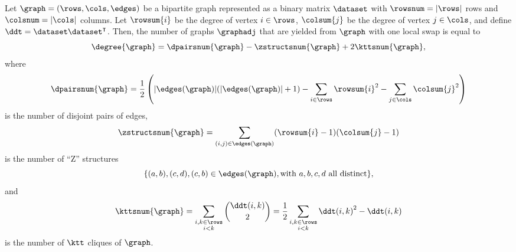 \begin{theorem}\label{thm:degree}
	Let $\graph = (\rows, \cols, \edges)$ be a bipartite graph represented as a
	binary matrix $\dataset$ with $\rowsnum = |\rows|$ rows and $\colsnum =
	|\cols|$ columns. Let $\rowsum{i}$ be the degree of vertex $i \in \rows$,
	$\colsum{j}$ be the degree of vertex $j \in \cols$, and define $\ddt =
	\dataset \dataset^\intercal$. Then, the number of graphs $\graphadj$ that are
	yielded from $\graph$ with one local swap is equal to
	\begin{equation}\label{eq:graphdeg}
		\degree{\graph} = \dpairsnum{\graph} - \zstructsnum{\graph} + 2
		\kttsnum{\graph},
	\end{equation}
	where
	\begin{equation}\label{eq:dpairnum}
		\dpairsnum{\graph} = \frac{1}{2} \left(|\edges(\graph)| (|\edges(\graph)| +
		1) - \sum_{i \in \rows} \rowsum{i}^2 - \sum_{j \in \cols}
		\colsum{j}^2\right)
	\end{equation}
	is the number of disjoint pairs of edges,
	\begin{equation}\label{eq:zstructnum}
		\zstructsnum{\graph} = \sum_{(i, j) \in \edges(\graph)} (\rowsum{i} - 1)
		(\colsum{j} - 1)
	\end{equation}
	is the number of ``Z'' structures
	\[
		\{(a, b), (c, d), (c, b) \in \edges(\graph), \text{with $a, b, c, d$ all
		distinct}\},
	\]
	and
	\begin{equation}\label{eq:kttnum}
		\kttsnum{\graph} = \sum_{\substack{i, k \in \rows \\ i < k}}
		\binom{\ddt(i, k)}{2} = \frac{1}{2} \sum_{\substack{i, k \in \rows \\i <
		k}} {\ddt(i, k)}^2 - \ddt(i, k)
	\end{equation}
	is the number of $\ktt$ cliques of $\graph$.
\end{theorem}

